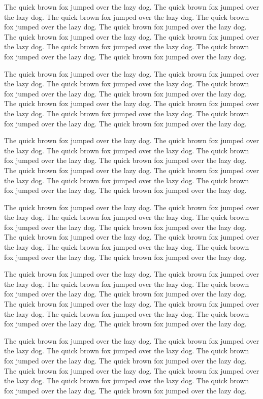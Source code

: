 \documentclass[12pt]{article}
\begin{document}
The quick brown fox jumped over the lazy dog.
The quick brown fox jumped over the lazy dog.
The quick brown fox jumped over the lazy dog.
The quick brown fox jumped over the lazy dog.
The quick brown fox jumped over the lazy dog.
The quick brown fox jumped over the lazy dog.
The quick brown fox jumped over the lazy dog.
The quick brown fox jumped over the lazy dog.
The quick brown fox jumped over the lazy dog.
The quick brown fox jumped over the lazy dog.

The quick brown fox jumped over the lazy dog.
The quick brown fox jumped over the lazy dog.
The quick brown fox jumped over the lazy dog.
The quick brown fox jumped over the lazy dog.
The quick brown fox jumped over the lazy dog.
The quick brown fox jumped over the lazy dog.
The quick brown fox jumped over the lazy dog.
The quick brown fox jumped over the lazy dog.
The quick brown fox jumped over the lazy dog.
The quick brown fox jumped over the lazy dog.

The quick brown fox jumped over the lazy dog.
The quick brown fox jumped over the lazy dog.
The quick brown fox jumped over the lazy dog.
The quick brown fox jumped over the lazy dog.
The quick brown fox jumped over the lazy dog.
The quick brown fox jumped over the lazy dog.
The quick brown fox jumped over the lazy dog.
The quick brown fox jumped over the lazy dog.
The quick brown fox jumped over the lazy dog.
The quick brown fox jumped over the lazy dog.

The quick brown fox jumped over the lazy dog.
The quick brown fox jumped over the lazy dog.
The quick brown fox jumped over the lazy dog.
The quick brown fox jumped over the lazy dog.
The quick brown fox jumped over the lazy dog.
The quick brown fox jumped over the lazy dog.
The quick brown fox jumped over the lazy dog.
The quick brown fox jumped over the lazy dog.
The quick brown fox jumped over the lazy dog.
The quick brown fox jumped over the lazy dog.

The quick brown fox jumped over the lazy dog.
The quick brown fox jumped over the lazy dog.
The quick brown fox jumped over the lazy dog.
The quick brown fox jumped over the lazy dog.
The quick brown fox jumped over the lazy dog.
The quick brown fox jumped over the lazy dog.
The quick brown fox jumped over the lazy dog.
The quick brown fox jumped over the lazy dog.
The quick brown fox jumped over the lazy dog.
The quick brown fox jumped over the lazy dog.

The quick brown fox jumped over the lazy dog.
The quick brown fox jumped over the lazy dog.
The quick brown fox jumped over the lazy dog.
The quick brown fox jumped over the lazy dog.
The quick brown fox jumped over the lazy dog.
The quick brown fox jumped over the lazy dog.
The quick brown fox jumped over the lazy dog.
The quick brown fox jumped over the lazy dog.
The quick brown fox jumped over the lazy dog.
The quick brown fox jumped over the lazy dog.
\end{document}
